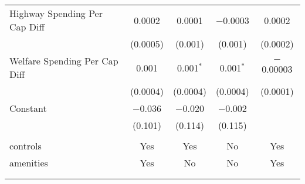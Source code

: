 \begin{table}[!htbp]
\begin{tabular}{@{\extracolsep{5pt}}lcccc}
  Highway Spending Per Cap Diff & 0.0002 & 0.0001 & $-$0.0003 & 0.0002 \\ 
  & (0.0005) & (0.001) & (0.001) & (0.0002) \\ 
  Welfare Spending Per Cap Diff & 0.001 & 0.001$^{*}$ & 0.001$^{*}$ & $-$0.00003 \\ 
  & (0.0004) & (0.0004) & (0.0004) & (0.0001) \\ 
  Constant & $-$0.036 & $-$0.020 & $-$0.002 &  \\ 
  & (0.101) & (0.114) & (0.115) &  \\ 
 \hline \\[-1.8ex] 
controls & Yes & Yes & No & Yes \\ 
amenities & Yes & No & No & Yes \\ 
\hline \\[-1.8ex] 
\hline 
\hline \\[-1.8ex] 
\end{tabular} 
\end{table} 
